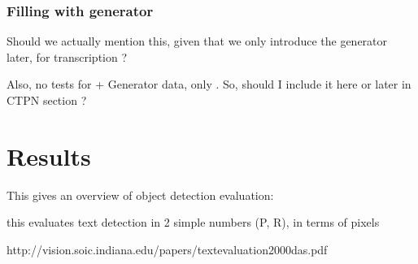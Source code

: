 

		\subsubsection{Filling with generator}
		\startToDo
			Should we actually mention this, given that we only introduce the generator later, for transcription ?

			Also, no tests for \FRCNN{} + Generator data, only \CTPN{}. So, should I include it here or later in CTPN section ?
		\stopToDo



\section{Results}\label{sec:detection_results}
	This gives an overview of object detection evaluation:


	this evaluates text detection in 2 simple numbers (P, R), in terms of pixels

	http://vision.soic.indiana.edu/papers/textevaluation2000das.pdf



